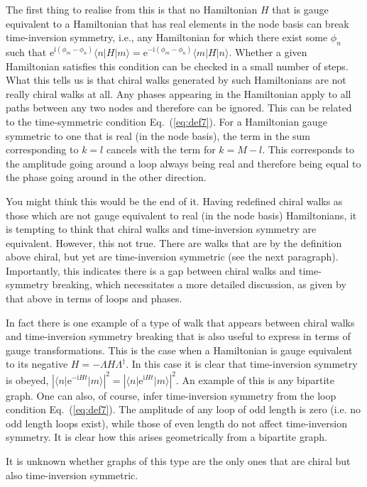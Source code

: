 \documentclass[aps,pra,12pt,nofootinbib,superscriptaddress,longbibliography,showpacs]{revtex4-1}
\theoremstyle{plain}
\theoremstyle{definition}
\newcommand{\bra}[1]{\mbox{$\langle #1|$}}
\newcommand{\ket}[1]{\ensuremath{|#1\rangle}}
\newcommand{\eee}{\mathrm{e}}
\newcommand{\ii}{\mathrm{i}}
\newcommand{\eqr}[1]{Eq.~(\ref{#1})}
\begin{document}
The first thing to realise from this is that no Hamiltonian $H$ that is gauge equivalent to a Hamiltonian that has real elements in the node basis can break time-inversion symmetry, i.e., any Hamiltonian for which there exist some $\phi_n$ such that $\eee^{\ii (\phi_m - \phi_n)} \bra{n} H \ket{m} = \eee^{-\ii (\phi_m - \phi_n)} \bra{m} H \ket{n}$. Whether a given Hamiltonian satisfies this condition can be checked in a small number of steps. What this tells us is that chiral walks generated by such Hamiltonians are not really chiral walks at all. Any phases appearing in the Hamiltonian apply to all paths between any two nodes and therefore can be ignored. This can be related to the time-symmetric condition \eqr{eq:def7}. For a Hamiltonian gauge symmetric to one that is real (in the node basis), the term in the sum corresponding to $k= l$ cancels with the term for $k= M-l$. This corresponds to the amplitude going around a loop always being real and therefore being equal to the phase going around in the other 
direction. 

You might think this would be the end of it. Having redefined chiral walks as those which are not gauge equivalent to real (in the node basis) Hamiltonians, it is tempting to think that chiral walks and time-inversion symmetry are equivalent. However, this not true. There are walks that are by the definition above chiral, but yet are time-inversion symmetric (see the next paragraph). Importantly, this indicates there is a gap between chiral walks and time-symmetry breaking, which necessitates a more detailed discussion, as given by that above in terms of loops and phases.

In fact there is one example of a type of walk that appears between chiral walks and time-inversion symmetry breaking that is also useful to express in terms of gauge transformations. This is the case when a Hamiltonian is gauge equivalent to its negative $H = - \Lambda H \Lambda^\dagger$. In this case it is clear that time-inversion symmetry is obeyed, $| \bra{n} \eee^{-\ii H t} \ket{m} |^2 = | \bra{n} \eee^{\ii H t} \ket{m} |^2$. An example of this is any bipartite graph. One can also, of course, infer time-inversion symmetry from the loop condition \eqr{eq:def7}. The amplitude of any loop of odd length is zero (i.e. no odd length loops exist), while those of even length do not affect time-inversion symmetry. It is clear how this arises geometrically from a bipartite graph.

It is unknown whether graphs of this type are the only ones that are chiral but also time-inversion symmetric.
\end{document}
